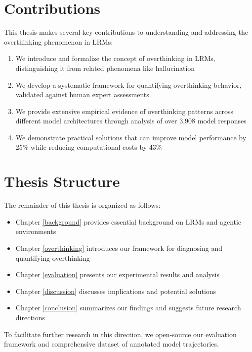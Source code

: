 \section{Contributions}
This thesis makes several key contributions to understanding and addressing the overthinking phenomenon in LRMs:

\begin{enumerate}
    \item We introduce and formalize the concept of overthinking in LRMs, distinguishing it from related phenomena like hallucination
    \item We develop a systematic framework for quantifying overthinking behavior, validated against human expert assessments
    \item We provide extensive empirical evidence of overthinking patterns across different model architectures through analysis of over 3,908 model responses
    \item We demonstrate practical solutions that can improve model performance by 25\% while reducing computational costs by 43\%
\end{enumerate}

\section{Thesis Structure}
The remainder of this thesis is organized as follows:

\begin{itemize}
    \item Chapter \ref{background} provides essential background on LRMs and agentic environments
    \item Chapter \ref{overthinking} introduces our framework for diagnosing and quantifying overthinking
    \item Chapter \ref{evaluation} presents our experimental results and analysis
    \item Chapter \ref{discussion} discusses implications and potential solutions
    \item Chapter \ref{conclusion} summarizes our findings and suggests future research directions
\end{itemize}

To facilitate further research in this direction, we open-source our evaluation framework and comprehensive dataset of annotated model trajectories.
